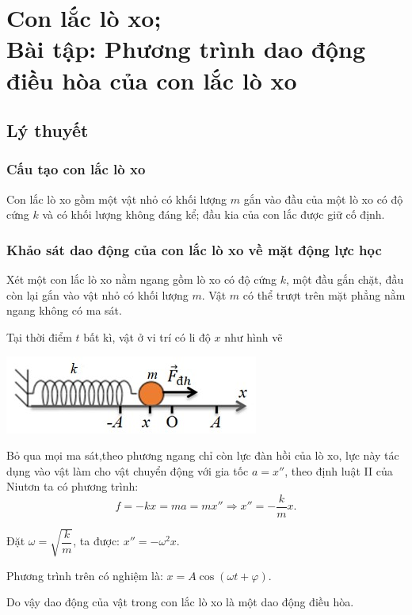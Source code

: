 
\chapter[Con lắc lò xo;\\
Bài tập: Phương trình dao động điều hòa của con lắc lò xo]{Con lắc lò xo;\\Bài tập: Phương trình dao động điều hòa của con lắc lò xo}
\section{Lý thuyết}
\subsection{Cấu tạo con lắc lò xo}
Con lắc lò xo gồm một vật nhỏ có khối lượng $m$ gắn vào đầu của một lò xo có độ cứng $k$ và có khối lượng không đáng kể; đầu kia của con lắc được giữ cố định.
\subsection{Khảo sát dao động của con lắc lò xo về mặt động lực học}
Xét một con lắc lò xo nằm ngang gồm lò xo có độ cứng $k$, một đầu gắn chặt, đầu còn lại gắn vào vật nhỏ có khối lượng $m$. Vật $m$ có thể trượt trên mặt phẳng nằm  ngang không có ma sát.

Tại thời điểm $t$ bất kì, vật ở vi trí có li độ $x$ như hình vẽ
\begin{center}
	\includegraphics[scale=1]{../figs/VN12-PH-03-L-002-1-V2-1.jpg}
\end{center}

Bỏ qua mọi ma sát,theo phương ngang chỉ còn lực đàn hồi của lò xo, lực này tác dụng vào vật làm cho vật chuyển động với gia tốc $a=x''$, theo định luật II của Niutơn ta có phương trình: 
\begin{equation*}
	f=-kx=ma=mx''\Rightarrow x''=-\dfrac{k}{m}x.
\end{equation*}

Đặt $\omega=\sqrt{\dfrac{k}{m}}$, ta được: $x''=-\omega^2x$.

Phương trình trên có nghiệm là: $x=A\cos \left( \omega t+\varphi\right)$.

Do vậy dao động của vật trong con lắc lò xo là một dao động điều hòa.


